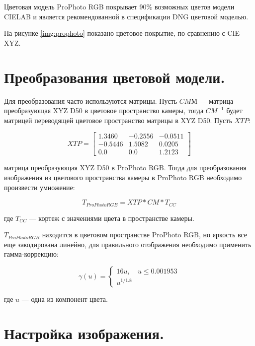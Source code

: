 Цветовая модель ProPhoto RGB покрывает 90\% возможных цветов модели CIELAB и является рекомендованной в спецификации DNG цветовой моделью. \cite{dngspec}

 На рисунке \ref{img:prophoto} показано цветовое покрытие, по сравнению с CIE XYZ.


\section{Преобразования цветовой модели.}

Для преобразования часто используются матрицы. Пусть $CMМ$ --- матрица преобразующая XYZ D50 в цветовое пространство камеры, тогда $CM^{-1}$ будет матрицей переводящей цветовое пространство матрицы в XYZ D50. Пусть $XTP$:

\begin{equation}
	\label{XTP}
	XTP = \begin{bmatrix}
			1.3460 & -0.2556 & -0.0511 \\
			-0.5446 & 1.5082 & 0.0205 \\
			0.0 & 0.0 & 1.2123 
		\end{bmatrix}
\end{equation}

матрица преобразующая XYZ D50 в ProPhoto RGB. Тогда для преобразования изображения из цветового пространства камеры в ProPhoto RGB необходимо произвести умножение:

\begin{equation}
	\label{tosrgb}
	T_{ProPhoto RGB} = XTP * CM * T_{CC}
\end{equation}

где $T_{CC}$ --- кортеж с значениями цвета в пространстве камеры.

$T_{ProPhoto RGB}$ находится в цветовом пространстве ProPhoto RGB, но яркость все еще закодирована линейно, для правильного отображения необходимо применить гамма-коррекцию:

\begin{equation}
	\label{gamma}
	\gamma(u) = 
	\begin{cases}
		16u, & u \le 0.001953 \\
		u^{1/1.8}
	\end{cases}
\end{equation}

где $u$ --- одна из компонент цвета. \cite{ppspec}

\section{Настройка изображения.}


